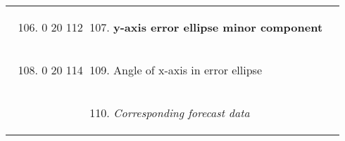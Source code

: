 \begin{longtable}[]{@{}llll@{}}
\begin{minipage}[t]{0.22\columnwidth}
\strut
\end{minipage} & \begin{minipage}[t]{0.22\columnwidth}\raggedright
\begin{enumerate}
\setcounter{enumi}{105}
\item
  0 20 112
\end{enumerate}\strut
\end{minipage} & \begin{minipage}[t]{0.22\columnwidth}\raggedright
\begin{enumerate}
\setcounter{enumi}{106}
\item
  \textbf{y-axis error ellipse minor component}
\end{enumerate}\strut
\end{minipage} & \begin{minipage}[t]{0.22\columnwidth}\raggedright
\strut
\end{minipage}\tabularnewline
\begin{minipage}[t]{0.22\columnwidth}\raggedright
\strut
\end{minipage} & \begin{minipage}[t]{0.22\columnwidth}\raggedright
\begin{enumerate}
\setcounter{enumi}{107}
\item
  0 20 114
\end{enumerate}\strut
\end{minipage} & \begin{minipage}[t]{0.22\columnwidth}\raggedright
\begin{enumerate}
\setcounter{enumi}{108}
\item
  Angle of x-axis in error ellipse
\end{enumerate}\strut
\end{minipage} & \begin{minipage}[t]{0.22\columnwidth}\raggedright
\strut
\end{minipage}\tabularnewline
\begin{minipage}[t]{0.22\columnwidth}\raggedright
\strut
\end{minipage} & \begin{minipage}[t]{0.22\columnwidth}\raggedright
\strut
\end{minipage} & \begin{minipage}[t]{0.22\columnwidth}\raggedright
\begin{enumerate}
\setcounter{enumi}{109}
\item
  \emph{Corresponding forecast data}
\end{enumerate}\strut

\end{minipage}
\end{longtable}
